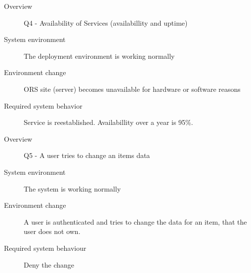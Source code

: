 \begin{description}
    \item[Overview] Q4 - Availability of Services (availabillity and uptime)
    \item[System environment] The deployment environment is working normally
    \item[Environment change] ORS site (server) becomes unavailable for hardware or software reasons
    \item[Required system behavior] Service is reestablished. Availabillity over a year is 95\%.
\end{description}

\begin{description}
    \item[Overview] Q5 - A user tries to change an items data
    \item[System environment] The system is working normally
    \item[Environment change] A user is authenticated and tries to change the
        data for an item, that the user does not own.
    \item[Required system behaviour] Deny the change
\end{description}

